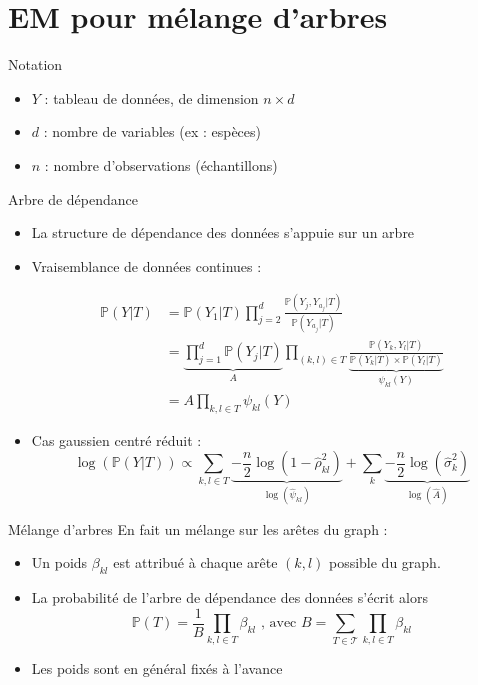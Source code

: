 \documentclass{bredelebeamer}
\begin{document}
\section{EM pour mélange d'arbres}
\begin{frame}{Notation}
    \begin{itemize}
        \item $Y$ : tableau de données, de dimension $n\times d$
        \item $d$ : nombre de variables (ex : espèces)
        \item $n$ : nombre d'observations (échantillons)
    \end{itemize}
\end{frame}
\begin{frame}{Arbre de dépendance}
\begin{itemize}
    \item La structure de dépendance des données s'appuie sur un arbre
    \item Vraisemblance de données continues \cite{ChowLiu}:
     
\begin{align*}
\mathds{P}(Y|T) &=\mathds{P}(Y_1|T)\prod_{j=2}^d \frac{\mathds{P}(Y_j,Y_{a_j}|T)}{\mathds{P}(Y_{a_j}|T)}\\
&=\underbrace{\prod_{j=1}^d \mathds{P}(Y_j|T)}_{\text{$A$}}\prod_{(k,l)\in T} \underbrace{\frac{\mathds{P}(Y_k,Y_l|T)}{\mathds{P}(Y_k|T)\times \mathds{P}(Y_l|T)}}_{\psi_{kl}(Y)}\\
&=A\prod_{k,l \in T}\psi_{kl}(Y)
\end{align*}
\item Cas gaussien centré réduit :
\[\log(\mathds{P}(Y|T))   \propto \sum_{k,l\in T}\underbrace{-\frac{n}{2}\log (1-\hat{\rho}_{kl}^2)}_{\log(\hat{\psi}_{kl})}+\sum_k\underbrace{-\frac{n}{2} \log(\hat{\sigma}_k^2)}_{\log(\hat{A})}\]
\end{itemize}
    
\end{frame}
\begin{frame}{Mélange d'arbres}
En fait un mélange sur les arêtes du graph :
\begin{itemize}
    \item Un poids $\beta_{kl}$ est attribué à chaque arête $(k,l)$ possible du graph.
    \item La probabilité de l'arbre de dépendance des données s'écrit alors
    \[ \mathds{P}(T) = \frac{1}{B}\prod_{k,l\in T} \beta_{kl} \text{ , avec } B = \sum_{T\in\mathcal{T}} \prod_{k,l\in T} \beta_{kl} \]
    \item Les poids sont en général fixés à l'avance
\end{itemize}
\end{frame}
\end{document}
